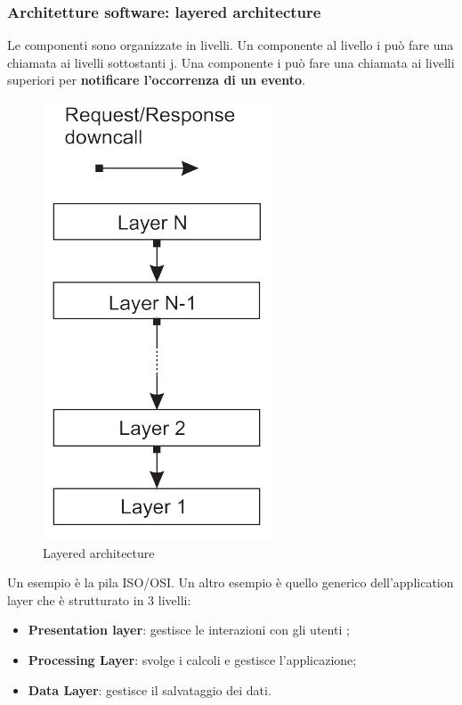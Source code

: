 \documentclass[12pt]{article}
\begin{document}
	\subsubsection{Architetture software: layered architecture}
		Le componenti sono organizzate in livelli. Un componente al livello i può fare una chiamata ai livelli sottostanti j. Una componente i può fare una chiamata ai livelli superiori per \textbf{notificare l'occorrenza di un evento}.
		\begin{figure}[h!]
			\centering
			\includegraphics[scale=0.30]{img/boh.png}
			\caption{Layered architecture}
		\end{figure}
	 Un esempio è la pila ISO/OSI. Un altro esempio è quello generico dell'application layer che è strutturato in 3 livelli:
	 \begin{itemize}
	 	\item \textbf{Presentation layer}: gestisce le interazioni con gli utenti ;
	 	\item \textbf{Processing Layer}: svolge i calcoli e gestisce l'applicazione;
	 	\item \textbf{Data Layer}: gestisce il salvataggio dei dati.
	 \end{itemize}
\end{document}
